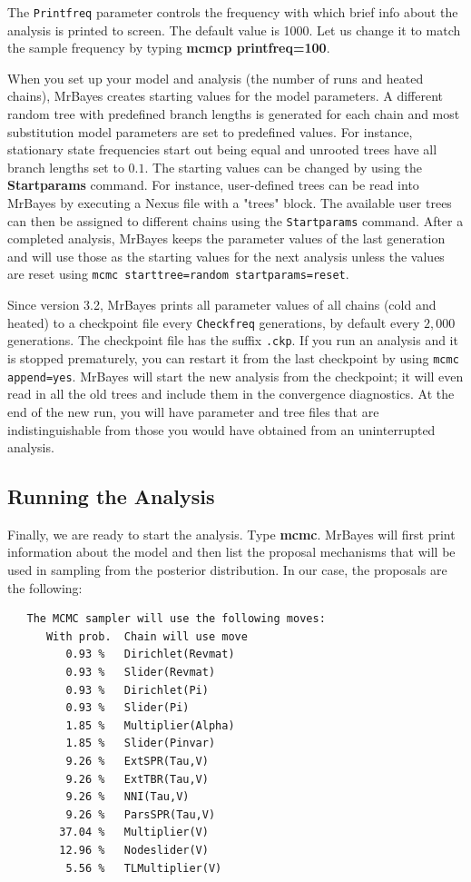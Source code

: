 \documentclass[12pt]{book}
\begin{document}
The \texttt{Printfreq} parameter controls the frequency with which brief info about the analysis is
printed to screen. The default value is 1000. Let us change it to match the sample frequency by
typing \textbf{mcmcp printfreq=100}.

When you set up your model and analysis (the number of runs and heated chains), MrBayes creates
starting values for the model parameters. A different random tree with predefined branch lengths is
generated for each chain and most substitution model parameters are set to predefined values. For
instance, stationary state frequencies start out being equal and unrooted trees have all branch
lengths set to $0.1$. The starting values can be changed by using the \textbf{Startparams} command.
For instance, user-defined trees can be read into MrBayes by executing a Nexus file with a "trees"
block. The available user trees can then be assigned to different chains using the
\texttt{Startparams} command. After a completed analysis, MrBayes keeps the parameter values of the
last generation and will use those as the starting values for the next analysis unless the values
are reset using \texttt{mcmc starttree=random startparams=reset}.

Since version 3.2, MrBayes prints all parameter values of all chains (cold and heated) to a
checkpoint file every \texttt{Checkfreq} generations, by default every $2,000$ generations. The
checkpoint file has the suffix \texttt{.ckp}. If you run an analysis and it is stopped prematurely,
you can restart it from the last checkpoint by using \texttt{mcmc append=yes}. MrBayes will start
the new analysis from the checkpoint; it will even read in all the old trees and include them in
the convergence diagnostics. At the end of the new run, you will have parameter and tree files that
are indistinguishable from those you would have obtained from an uninterrupted analysis.

\subsection{Running the Analysis}

Finally, we are ready to start the analysis. Type \textbf{mcmc}. MrBayes will first print
information about the model and then list the proposal mechanisms that will be used in sampling
from the posterior distribution. In our case, the proposals are the following:

\begin{singlespacing}
\small
\begin{verbatim}
   The MCMC sampler will use the following moves:
      With prob.  Chain will use move
         0.93 %   Dirichlet(Revmat)
         0.93 %   Slider(Revmat)
         0.93 %   Dirichlet(Pi)
         0.93 %   Slider(Pi)
         1.85 %   Multiplier(Alpha)
         1.85 %   Slider(Pinvar)
         9.26 %   ExtSPR(Tau,V)
         9.26 %   ExtTBR(Tau,V)
         9.26 %   NNI(Tau,V)
         9.26 %   ParsSPR(Tau,V)
        37.04 %   Multiplier(V)
        12.96 %   Nodeslider(V)
         5.56 %   TLMultiplier(V)
\end{verbatim}
\normalsize
\end{singlespacing}
\end{document}

